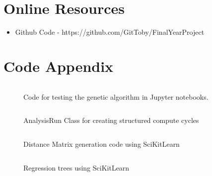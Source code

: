 \begin{appendices}
    \chapter{Online Resources}\label{apndx:resources}
    \begin{itemize}
        \item Github Code - https://github.com/GitToby/FinalYearProject
    \end{itemize}
    \chapter{Code Appendix}\label{apndx:code}
    \begin{figure}[ht]
        \inputminted[fontsize=\small]{python}{./code_snippets/appendix/runGeneticAlgo.py}
        \caption{Code for testing the genetic algorithm in Jupyter notebooks.}\label{apcode:runGeneticAlgo.py}
    \end{figure}

    \begin{figure}[ht]
        \inputminted[fontsize=\small]{python}{./code_snippets/appendix/AnalysisRun.py}
        \caption{AnalysisRun Class for creating structured compute cycles}\label{apcode:AnalysisRun.py}
    \end{figure}

    \begin{figure}[ht]
        \inputminted[fontsize=\small]{python}{./code_snippets/appendix/dist_matrix.py}
        \caption{Distance Matrix generation code using SciKitLearn}\label{apcode:dist_matrix.py}
    \end{figure}

    \begin{figure}[ht]
        \inputminted[fontsize=\small]{python}{./code_snippets/appendix/reg_tree.py}
        \caption{Regression trees using SciKitLearn}\label{apcode:reg_tree.py}
    \end{figure}


\end{appendices}
